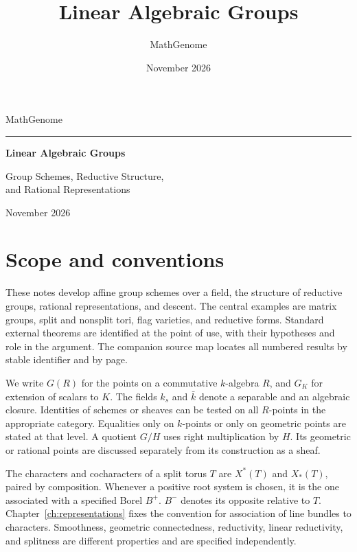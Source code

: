 \documentclass[11pt,a4paper,openany,oneside]{book}
\title{Linear Algebraic Groups}
\author{MathGenome}
\date{November 2026}
\theoremstyle{resultstyle}
\theoremstyle{definition}
\numberwithin{equation}{chapter}
\begin{document}
\hypersetup{pageanchor=false}
\begin{titlepage}
\thispagestyle{empty}
\vspace*{0.17\textheight}
{\large\color{inkgreen}MathGenome\par}
\vspace{1.2em}
{\color{inkgreen}\noindent\rule{\linewidth}{0.7pt}\par}
\vspace{2.2em}
{\raggedright\Huge\bfseries Linear Algebraic Groups\par}
\vspace{1.5em}
{\Large Group Schemes, Reductive Structure,\\[0.25em] and Rational Representations\par}
\vfill
{\large November 2026\par}
\end{titlepage}
\frontmatter
\hypersetup{pageanchor=true}
\tableofcontents

\chapter*{Scope and conventions}

These notes develop affine group schemes over a field, the structure of reductive groups, rational representations, and descent. The central examples are matrix groups, split and nonsplit tori, flag varieties, and reductive forms. Standard external theorems are identified at the point of use, with their hypotheses and role in the argument. The companion source map locates all numbered results by stable identifier and by page.

We write $G(R)$ for the points on a commutative $k$-algebra $R$, and $G_{K}$ for extension of scalars to $K$. The fields $k_s$ and $\bar k$ denote a separable and an algebraic closure. Identities of schemes or sheaves can be tested on all $R$-points in the appropriate category. Equalities only on $k$-points or only on geometric points are stated at that level. A quotient $G/H$ uses right multiplication by $H$. Its geometric or rational points are discussed separately from its construction as a sheaf.

The characters and cocharacters of a split torus $T$ are $X^*(T)$ and $X_*(T)$, paired by composition. Whenever a positive root system is chosen, it is the one associated with a specified Borel $B^+$. $B^-$ denotes its opposite relative to $T$. Chapter~\ref{ch:representations} fixes the convention for association of line bundles to characters. Smoothness, geometric connectedness, reductivity, linear reductivity, and splitness are different properties and are specified independently.
\end{document}
